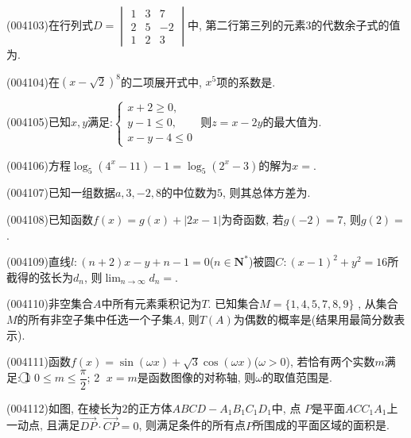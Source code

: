 \item (004103)在行列式$D=\begin{vmatrix}1&3&7\\2&5&-2\\1&2&3\end{vmatrix}$中, 第二行第三列的元素$3$的代数余子式的值为.
\item (004104)在$(x-\sqrt 2)^8$的二项展开式中, $x^5$项的系数是.
\item (004105)已知$x,y$满足:$\begin{cases}  x+2\ge 0,  \\y-1\le 0,  \\x-y-4\le 0  \end{cases}$ 则$z=x-2y$的最大值为.
\item (004106)方程$\log_5(4^x-11)-1=\log_5(2^x-3)$的解为$x=$.
\item (004107)已知一组数据$a,3,-2,8$的中位数为$5$, 则其总体方差为.
\item (004108)已知函数$f(x)=g(x)+|2x-1|$为奇函数, 若$g(-2)=7$, 则$g(2)=$.
\item (004109)直线$l:(n+2)x-y+n-1=0$($n\in \mathbf{N}^*$)被圆$C:(x-1)^2+y^2=16$所截得的弦长为$d_n$, 则$\displaystyle\lim_{n\to \infty}d_n=$.
\item (004110)非空集合$A$中所有元素乘积记为$T$. 已知集合$M=\{1,4,5,7,8,9\}$ , 从集合$M$的所有非空子集中任选一个子集$A$, 则$T(A)$为偶数的概率是(结果用最简分数表示).
\item (004111)函数$f(x)=\sin(\omega x)+\sqrt 3\cos (\omega x)$($\omega >0$), 若恰有两个实数$m$满足: \textcircled{1}  $0\le m\le \dfrac{\pi}2$; \textcircled{2} $x=m$是函数图像的对称轴, 则$\omega$的取值范围是.
\item (004112)如图, 在棱长为$2$的正方体$ABCD-A_1B_1C_1D_1$中, 点
$P$是平面$ACC_1A_1$上一动点, 且满足$\overrightarrow{DP}\cdot \overrightarrow{CP}=0$, 则满足条件的所有点$P$所围成的平面区域的面积是.
\begin{center}
\end{center}
